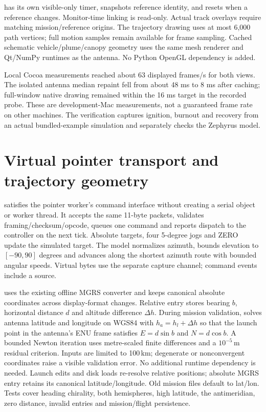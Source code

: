  has its own visible-only timer, snapshots reference identity,
and resets when a reference changes. Monitor-time linking is read-only. Actual
track overlays require matching mission/reference origins. The trajectory drawing
uses at most 6,000 path vertices; full motion samples remain available for frame
sampling. Cached schematic vehicle/plume/canopy geometry uses the same mesh
renderer and Qt/NumPy runtimes as the antenna. No Python OpenGL dependency is added.

Local Cocoa measurements reached about 63 displayed frames/s for both views.
The isolated antenna median repaint fell from about 48 ms to 8 ms after caching;
full-window native drawing remained within the 16 ms target in the recorded
probe. These are development-Mac measurements, not a guaranteed frame rate on
other machines. The verification captures ignition, burnout and recovery from
an actual bundled-example simulation and separately checks the Zephyrus model.

\section{Virtual pointer transport and trajectory geometry}
 satisfies the pointer worker's command interface without
creating a serial object or worker thread. It accepts the same 11-byte packets,
validates framing/checksum/opcode, queues one command and reports dispatch to the
controller on the next tick. Absolute targets, four 5-degree jogs and ZERO update
the simulated target. The model normalizes azimuth, bounds elevation to
$[-90,90]$ degrees and advances along the shortest azimuth route with bounded
angular speeds. Virtual bytes use the separate  capture
channel; command events include a  source.

 uses the existing offline MGRS converter and keeps
canonical absolute coordinates across display-format changes. Relative entry
stores bearing $b$, horizontal distance $d$ and altitude difference $\Delta h$.
During mission validation,  solves antenna latitude
and longitude on WGS84 with $h_a=h_l+\Delta h$ so that the launch point in the
antenna's ENU frame satisfies $E=d\sin b$ and $N=d\cos b$. A bounded Newton
iteration uses metre-scaled finite differences and a $10^{-5}$\,m residual
criterion. Inputs are limited to 100\,km; degenerate or nonconvergent coordinates
raise a visible validation error. No additional runtime dependency is needed.
Launch edits and disk loads re-resolve relative positions; absolute MGRS entry
retains its canonical latitude/longitude. Old mission files default to lat/lon.
Tests cover heading chirality, both hemispheres, high latitude, the antimeridian,
zero distance, invalid entries and mission/flight persistence.

